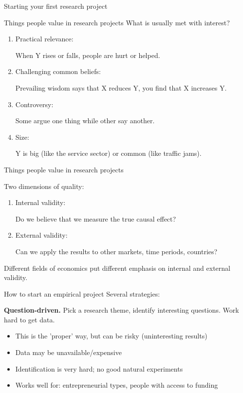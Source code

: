 \documentclass[notes=show,beamer,compress]{beamer}
\begin{document}
\begin{frame}
	
	\begin{center}
		\Large Starting your first research project
	\end{center}
\end{frame}

\begin{frame}{Things people value in research projects}
	What is usually met with interest?
	\begin{enumerate}
		\item Practical relevance: 
		
		When Y rises or falls, people are hurt or helped.
		\item Challenging common beliefs: 
		
		Prevailing wisdom says that X reduces Y, you find that X increases Y.
		\item Controversy: 
		
		Some argue one thing while other say another.
		\item Size: 
		
		Y is big (like the service sector) or common (like traffic jams).
	\end{enumerate}
		
\end{frame}

\begin{frame}{Things people value in research projects}
	
	Two dimensions of quality:
	\begin{enumerate}
		\item Internal validity: 
		
		Do we believe that we measure the true causal effect?
		\item External validity:
		
		Can we apply the results to other markets, time periods, countries?
	\end{enumerate}
	Different fields of economics put different emphasis on internal and external validity.
\end{frame}

\begin{frame}{How to start an empirical project}
	Several strategies:
	
	\medskip
	\textbf{Question-driven.} Pick a research theme, identify interesting questions. Work hard to get data.
	\begin{itemize}
		\item This is the 'proper' way, but can be risky (uninteresting results)
		\item{Data may be unavailable/expensive}
		\item{Identification is very hard; no good natural experiments}
		\item{Works well for: entrepreneurial types, people with access to funding}
	\end{itemize}
\end{frame}
\end{document}
